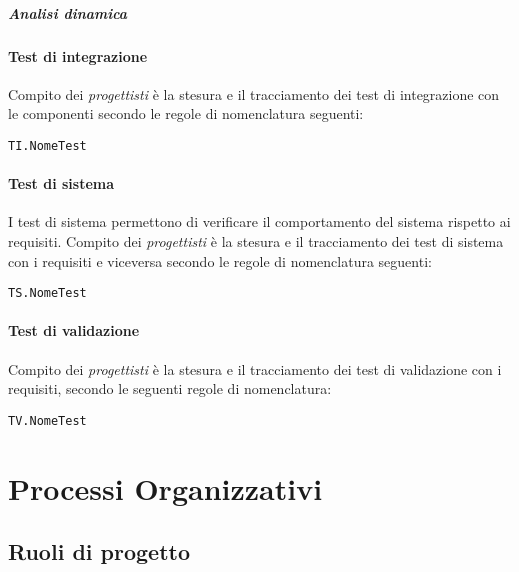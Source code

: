 \documentclass{scalatekids-article}
\begin{document}
\subparagraph{Analisi dinamica}

\paragraph{Test di integrazione}

Compito dei \textit{progettisti} è la stesura e il tracciamento dei test di
integrazione con le componenti secondo le regole di nomenclatura seguenti:

\begin{center}
  \verb=TI.NomeTest=
\end{center}

\paragraph{Test di sistema}

I test di sistema permettono di verificare il comportamento del sistema rispetto
ai requisiti. Compito dei \textit{progettisti} è la stesura e il tracciamento dei test di
sistema con i requisiti e viceversa secondo le regole di nomenclatura seguenti:

\begin{center}
  \verb=TS.NomeTest=
\end{center}

\paragraph{Test di validazione}

Compito dei \textit{progettisti} è la stesura e il tracciamento dei test di validazione
con i requisiti, secondo le seguenti regole di nomenclatura:

\begin{center}
  \verb=TV.NomeTest=
\end{center}

\section{Processi Organizzativi}

\subsection{Ruoli di progetto}
\end{document}
